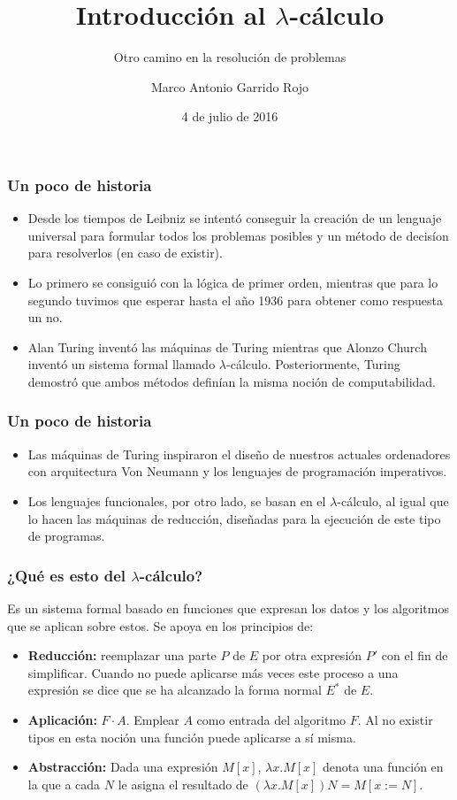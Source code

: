 \documentclass[spanish, a4paper, 12pt, final, slideColor, nototal, colorBG, pdf, noaccumulate, darkblue] {beamer}
\title{Introducción al $\lambda$-cálculo}
\subtitle{Otro camino en la resolución de problemas}
\author{Marco Antonio Garrido Rojo}
\date{4 de julio de 2016}
\begin{document}
\maketitle
\begin{frame}
    \frametitle{Un poco de historia}
    \begin{itemize}
        \item Desde los tiempos de Leibniz se intentó conseguir la creación de un lenguaje universal para formular todos los problemas posibles y un método de decisíon para resolverlos (en caso de existir).
        \item Lo primero se consiguió con la lógica de primer orden, mientras que para lo segundo tuvimos que esperar hasta el año 1936 para obtener como respuesta un no.
        \item Alan Turing inventó las máquinas de Turing mientras que Alonzo Church inventó un sistema formal llamado $\lambda$-cálculo. Posteriormente, Turing demostró que ambos métodos definían la misma noción de computabilidad.
    \end{itemize}
\end{frame}
\begin{frame}
    \frametitle{Un poco de historia}
    \begin{itemize}
        \item Las máquinas de Turing inspiraron el diseño de nuestros actuales ordenadores con arquitectura Von Neumann y los lenguajes de programación imperativos.
        \item Los lenguajes funcionales, por otro lado, se basan en el $\lambda$-cálculo, al igual que lo hacen las máquinas de reducción, diseñadas para la ejecución de este tipo de programas.
    \end{itemize}
\end{frame}
\begin{frame}
    \frametitle{¿Qué es esto del $\lambda$-cálculo?}
    Es un sistema formal basado en funciones que expresan los datos y los algoritmos que se aplican sobre estos. Se apoya en los principios de:
    \begin{itemize}
        \item {\textbf{Reducción: } reemplazar una parte $P$ de $E$ por otra expresión $P'$ con el fin de simplificar. Cuando no puede aplicarse más veces este proceso a una expresión se dice que se ha alcanzado la forma normal $E^*$ de $E$.}
        \item {\textbf{Aplicación: } $F\cdot A$. Emplear $A$ como entrada del algoritmo $F$. Al no existir tipos en esta noción una función puede aplicarse a sí misma.}
        \item {\textbf{Abstracción: } Dada una expresión $M[x]$, $\lambda x.M[x]$ denota una función en la que a cada $N$ le asigna el resultado de $(\lambda x.M[x])N = M[x := N]$.} %
    \end{itemize}
\end{frame}
\end{document}
